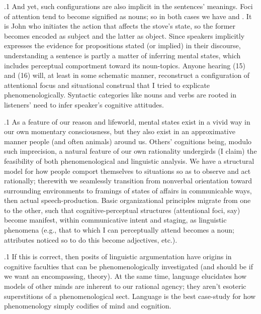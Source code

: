 \documentclass[11pt, twocolumn]{article}
\begin{document}
\p.1{%
\:\+And yet, such configurations are also implicit in the
sentences' meanings. \>  Foci of attention tend to become
signified as nouns; so in both cases we have  and
. \>  It is John who initiates the action that
affects the stove's state, so the former becomes encoded
as subject and the latter as object. \>  Since speakers
implicitly expresses the evidence for propositions
stated (or implied) in their discourse, understanding a
sentence is partly a matter of inferring mental states,
which includes perceptual comportment toward
its noun-topics. \>  Anyone hearing \exsRef(15) and \exsRef(16) will,
at least in some schematic manner, reconstruct a
configuration of attentional focus and situational
construal that I tried to explicate phenomenologically. \> 
Syntactic categories like nouns and verbs are
rooted in listeners' need to infer speaker's cognitive attitudes.\<\;
}%

\p.1{%
\:\+As a feature of our
reason and lifeworld, mental states exist
in a vivid way in our own momentary consciousness,
but they also exist in an approximative manner
\visavis{} people (and often animals) around us. \> 
Others' cognitions being, modulo such imprecision,
a natural feature of our own rationality undergirds
(I claim) the feasibility of both
phenomenological and linguistic analysis. \> 
We have a
structural model for how people comport themselves
to situations so as to observe and act rationally;
therewith we seamlessly transition
from nonverbal orientation toward surrounding
environments to framings of states of affairs
in communicable ways, then actual speech-production. \> 
Basic organizational principles migrate from one to
the other, such that cognitive-perceptual structures
(attentional foci, \pgl{}say) become manifest,
within communicative intent and staging, as
linguistic phenomena (e.g., that to which
I can perceptually attend becomes a noun; attributes
noticed so to do this become adjectives, etc.).\<\;
}%

\p.1{%
\:\+If this is correct, then posits of linguistic argumentation
have origins in cognitive faculties that can be
phenomenologically investigated (and should be if we
want an encompassing,  theory). \>  At the
same time, language elucidates
how models of other minds are inherent to our
rational agency; they aren't esoteric superstitions
of a phenomenological sect. \>  Language is the
best case-study for how phenomenology simply
codifies  of mind and cognition.\<\;
}%
\end{document}
